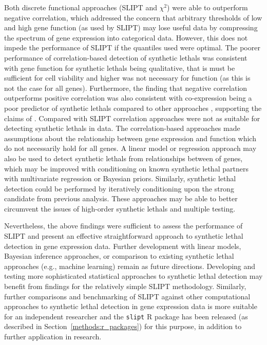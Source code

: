 Both discrete functional approaches (\gls{SLIPT} and $\chi^2$) were able to outperform negative correlation, which addressed the concern that arbitrary thresholds of low and high gene function (as used by \gls{SLIPT}) may lose useful data by compressing the spectrum of \gls{gene expression} into categorical data. However, this does not impede the performance of \gls{SLIPT} if the quantiles used were optimal. The poorer performance of correlation-based detection of \glspl{synthetic lethal} was consistent with gene function for \glspl{synthetic lethal} being qualitative, that is  must be sufficient for cell viability and higher  was not necessary  for function (as this is not the case for all genes). Furthermore, the finding that negative correlation outperforms positive correlation was also consistent with co-expression being a poor predictor of \glspl{synthetic lethal} compared to other approaches \citep{Jerby2014}, supporting the claims of \citet{Lu2015}.
%
Compared with \gls{SLIPT} correlation approaches were not as suitable for detecting \glspl{synthetic lethal} in  data. The correlation-based approaches made assumptions about the relationship between \gls{gene expression} and function which do not necessarily hold for all genes. %
A linear model or regression approach may also be used to detect \glspl{synthetic lethal} from relationships between  of genes, which 
may be improved with conditioning on known \gls{synthetic lethal} partners with multivariate regression or Bayesian priors. Similarly, \gls{synthetic lethal} detection could be performed by iteratively conditioning upon the strong candidate from previous analysis. These approaches may be able to better circumvent the issues of high-order \glspl{synthetic lethal} and multiple testing. 

Nevertheless, the above findings were sufficient to assess the performance of \gls{SLIPT} and present an effective straightforward approach to \gls{synthetic lethal} detection in \gls{gene expression} data. Further development with linear models, Bayesian inference approaches, or comparison to existing \gls{synthetic lethal} approaches (e.g., machine learning) remain as future directions. Developing and testing more sophisticated statistical approaches to \gls{synthetic lethal} detection may benefit from findings for the relatively simple \gls{SLIPT} methodology. Similarly, further comparisons and benchmarking of \gls{SLIPT} against other computational approaches to \gls{synthetic lethal} detection in \gls{gene expression} data is more suitable for an independent researcher and the \texttt{slipt} R package has been released (as described in Section~\ref{methods:r_packages}) for this purpose, in addition to further application in research.

